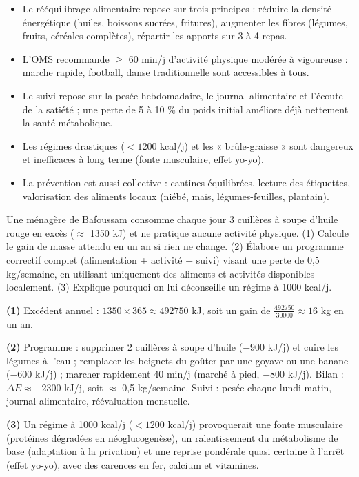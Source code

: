 \documentclass[11pt]{article}
\begin{document}
\begin{aretenir}
\begin{itemize}
\item Le rééquilibrage alimentaire repose sur trois principes : réduire la densité énergétique (huiles, boissons sucrées, fritures), augmenter les fibres (légumes, fruits, céréales complètes), répartir les apports sur 3 à 4 repas.
\item L'OMS recommande $\geq$ 60 min/j d'activité physique modérée à vigoureuse : marche rapide, football, danse traditionnelle sont accessibles à tous.
\item Le suivi repose sur la pesée hebdomadaire, le journal alimentaire et l'écoute de la satiété ; une perte de 5 à 10 \% du poids initial améliore déjà nettement la santé métabolique.
\item Les régimes drastiques ($< \num{1200}$ kcal/j) et les « brûle-graisse » sont dangereux et inefficaces à long terme (fonte musculaire, effet yo-yo).
\item La prévention est aussi collective : cantines équilibrées, lecture des étiquettes, valorisation des aliments locaux (niébé, maïs, légumes-feuilles, plantain).
\end{itemize}
\end{aretenir}

\begin{exercice}
Une ménagère de Bafoussam consomme chaque jour 3 cuillères à soupe d'huile rouge en excès ($\approx$ \num{1350} kJ) et ne pratique aucune activité physique. (1) Calcule le gain de masse attendu en un an si rien ne change. (2) Élabore un programme correctif complet (alimentation + activité + suivi) visant une perte de 0,5 kg/semaine, en utilisant uniquement des aliments et activités disponibles localement. (3) Explique pourquoi on lui déconseille un régime à \num{1000} kcal/j.
\end{exercice}

\begin{corrige}
\textbf{(1)} Excédent annuel : $1350 \times 365 \approx \num{492750}$ kJ, soit un gain de $\frac{492750}{30000} \approx 16$ kg en un an.

\textbf{(2)} Programme : supprimer 2 cuillères à soupe d'huile ($-900$ kJ/j) et cuire les légumes à l'eau ; remplacer les beignets du goûter par une goyave ou une banane ($-600$ kJ/j) ; marcher rapidement 40 min/j (marché à pied, $-800$ kJ/j). Bilan : $\Delta E \approx -2300$ kJ/j, soit $\approx$ 0,5 kg/semaine. Suivi : pesée chaque lundi matin, journal alimentaire, réévaluation mensuelle.

\textbf{(3)} Un régime à \num{1000} kcal/j ($< \num{1200}$ kcal/j) provoquerait une fonte musculaire (protéines dégradées en néoglucogenèse), un ralentissement du métabolisme de base (adaptation à la privation) et une reprise pondérale quasi certaine à l'arrêt (effet yo-yo), avec des carences en fer, calcium et vitamines.
\end{corrige}
\end{document}
